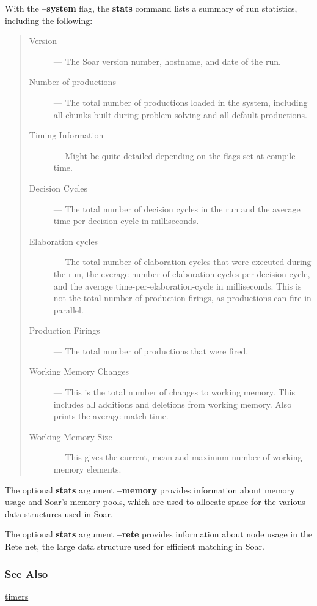 With the \textbf{--system} flag, the \textbf{stats} command lists a summary of run statistics, including the following: 
\begin{quote}
\begin{description}
\item[Version] --- The Soar version number, hostname, and date of the run.
\item[Number of productions] --- The total number of productions loaded in the
        system, including all chunks built during problem solving and all
        default productions.
\item[Timing Information] --- Might be quite detailed depending on the
flags set at compile time.  
\item[Decision Cycles] ---  The total number of decision cycles in the
	run and the average time-per-decision-cycle in milliseconds.
\item[Elaboration cycles] --- The total number of elaboration
	cycles that were executed during the run, the everage number of 
elaboration cycles per decision cycle,  and the average 
time-per-elaboration-cycle in milliseconds.  This is not the total number of
production firings, as productions can fire in parallel.
\item[Production Firings] --- The total number of productions that were fired. 
\item[Working Memory Changes] --- This is the total number of changes to
	working memory. This includes all additions and deletions from working memory.  Also prints the average match time.
\item[Working Memory Size] --- This gives the current, mean and maximum number 
	of working memory elements.
\end{description}
\end{quote}
The optional \textbf{stats} argument \textbf{--memory} provides information about memory usage and Soar's memory pools, which are used to allocate space for the various data structures used in Soar.

The optional \textbf{stats} argument \textbf{--rete} provides information about node usage in the Rete net, the large data structure used for efficient matching in Soar.

\subsubsection*{See Also}
\hyperref[timers]{timers} 

